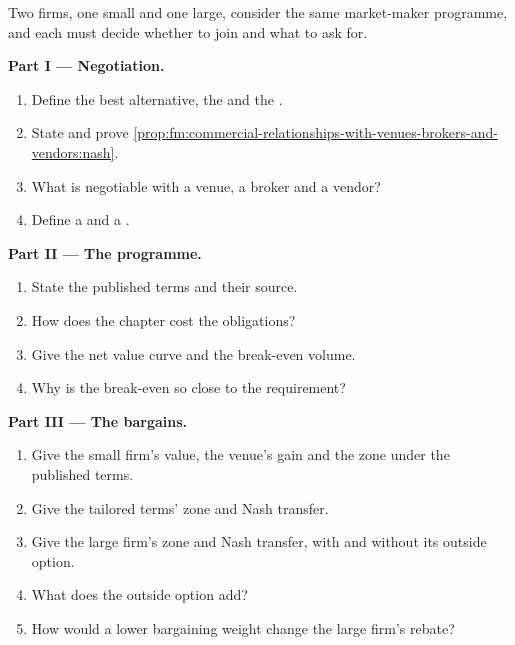 \begin{problem}\label{pb:fm:commercial-relationships-with-venues-brokers-and-vendors:1}
Two firms, one small and one large, consider the same market-maker programme, and each must decide whether to join and what to ask for.

\medskip\noindent\textbf{Part I --- Negotiation.}
\begin{enumerate}
\item Define the best alternative, the  and the .
\item State and prove \cref{prop:fm:commercial-relationships-with-venues-brokers-and-vendors:nash}.
\item What is negotiable with a venue, a broker and a vendor?
\item Define a  and a .
\end{enumerate}

\medskip\noindent\textbf{Part II --- The programme.}
\begin{enumerate}[resume]
\item State the published terms and their source.
\item How does the chapter cost the obligations?
\item Give the net value curve and the break-even volume.
\item Why is the break-even so close to the requirement?
\end{enumerate}

\medskip\noindent\textbf{Part III --- The bargains.}
\begin{enumerate}[resume]
\item Give the small firm's value, the venue's gain and the zone under the published terms.
\item Give the tailored terms' zone and Nash transfer.
\item Give the large firm's zone and Nash transfer, with and without its outside option.
\item What does the outside option add?
\item How would a lower bargaining weight change the large firm's rebate?
\end{enumerate}


\end{problem}
